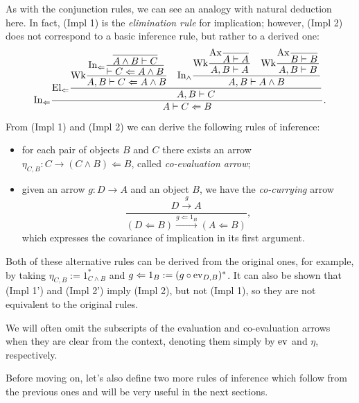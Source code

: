\begin{remark}
    As with the conjunction rules, we can see an analogy with natural deduction here. In fact, (Impl 1) is the \emph{elimination rule} for implication; however, (Impl 2) does not correspond to a basic inference rule, but rather to a derived one:
    \[ \textnormal{In}_{\Leftarrow}\frac{\displaystyle\textnormal{El}_{\Leftarrow}\frac{\displaystyle \textnormal{Wk}\frac{\displaystyle \textnormal{In}_{\Leftarrow}\frac{\displaystyle\frac{}{A \land B \vdash C}}{\vdash C \Leftarrow A \land B}}{A,B \vdash C \Leftarrow A \land B} \quad \displaystyle\textnormal{In}_{\land}\frac{\displaystyle\textnormal{Wk}\frac{\displaystyle\textnormal{Ax}\frac{}{A \vdash A}}{A, B \vdash A} \quad \displaystyle\textnormal{Wk}\frac{\displaystyle\textnormal{Ax}\frac{}{B \vdash B}}{A, B \vdash B}}{A, B \vdash A \land B}}{A,B \vdash C}}{A \vdash C \Leftarrow B}. \]
\end{remark}

\begin{remark}
    From (Impl 1) and (Impl 2) we can derive the following rules of inference:
    \begin{itemize}
        \item[(\textnormal{Impl 1'})] for each pair of objects $B$ and $C$ there exists an arrow $\eta_{C,B} : C \to (C \land B) \Leftarrow B$, called \emph{co-evaluation arrow};
        \item[(\textnormal{Impl 2'})] given an arrow $g : D \to A$ and an object $B$, we have the \emph{co-currying} arrow
        \[ \frac{D \xrightarrow{g} A}{(D \Leftarrow B) \xrightarrow{g \Leftarrow 1_B} (A \Leftarrow B)}, \]
    which expresses the covariance of implication in its first argument.
    \end{itemize}
    Both of these alternative rules can be derived from the original ones, for example, by taking $\eta_{C,B} := 1_{C \land B}^*$ and $g \Leftarrow 1_B := (g \circ \operatorname{ev}_{D,B})^*$. It can also be shown that (Impl 1') and (Impl 2') imply (Impl 2),
    but not (Impl 1), so they are not equivalent to the original rules.
\end{remark}

\begin{notation}
    We will often omit the subscripts of the evaluation and co-evaluation arrows when they are clear from the context, denoting them simply by $\operatorname{ev}$ and $\eta$, respectively.
\end{notation}

Before moving on, let's also define two more rules of inference which follow from the previous ones and will be very useful in the next sections.

